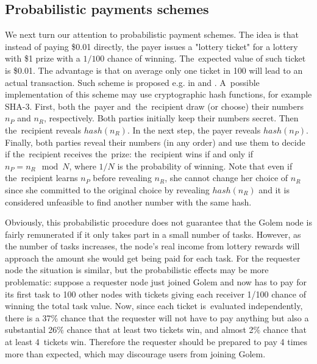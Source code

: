 \documentclass[a4paper]{article}
\begin{document}
\subsection{Probabilistic payments schemes}
    We next turn our attention to probabilistic payment schemes. The idea is that instead of paying \$0.01 directly,
    the payer issues a "lottery ticket" for a lottery with \$1 prize with a $1/100$ chance of winning. The~expected
    value of such ticket is \$0.01. The advantage is that on average only one ticket in 100 will lead to an actual
    transaction. Such scheme is proposed e.g. in \cite{RIVEST} and \cite{WHEELER}.
    A~possible implementation of this scheme may use cryptographic hash functions, for example SHA-3. First, both
    the~payer and~the~recipient draw (or choose) their numbers $n_P$ and $n_R$, respectively.
    Both parties initially keep their numbers secret. Then the~recipient reveals $hash(n_R)$. In the next step,
    the payer reveals $hash(n_P)$. Finally, both parties reveal their numbers (in any order) and use them to decide
    if the~recipient receives the~prize: the~recipient wins if and only if $n_P = n_R \mod N$, where $1/N$ is
    the probability of winning. Note that even if the~recipient learns $n_P$ before revealing $n_R$, she cannot change
    her choice of $n_R$ since she committed to the original choice by revealing $hash(n_R)$ and it is considered
    unfeasible to find another number with the same hash.

    Obviously, this probabilistic procedure does not guarantee that the Golem node is fairly remunerated if it only
    takes part in a small number of tasks. However, as the number of tasks increases, the node's real income from
    lottery rewards will approach the amount she would get being paid for each task. For the requester node the
    situation is similar, but the probabilistic effects may be more problematic: suppose a requester node just
    joined Golem and now has to pay for its first task to 100 other nodes with tickets giving each receiver
    1/100 chance of winning the total task value. Now, since each ticket is~evaluated independently,
    there is a 37\% chance that the requester will not have to pay anything but also a substantial 26\% chance that
    at least two tickets win, and almost 2\% chance that at least 4~tickets win. Therefore the requester should be
    prepared to pay 4 times more than expected, which may discourage users from joining Golem.
\end{document}
